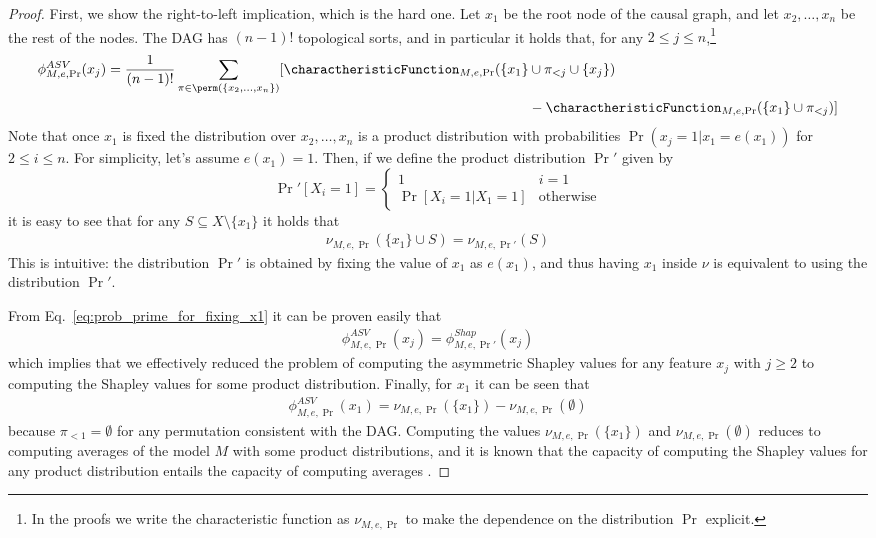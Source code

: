 \documentclass{llncs}
\begin{document}
\begin{proof}
	First, we show the right-to-left implication, which is the hard one. Let $x_1$ be the root node of the causal graph, and let $x_2,\ldots, x_n$ be the rest of the nodes. The DAG has $(n-1)!$ topological sorts, and in particular it holds that, for any $2 \leq j \leq n$,\footnote{In the proofs we write the characteristic function as $\nu_{M,e,\Pr}$ to make the dependence on the distribution $\Pr$ explicit.}
	\begin{align*}
	\phi^{ASV}_{M,e,\Pr}(x_j) = \frac{1}{(n-1)!} \sum_{\pi \in \perm(\{x_2, \ldots, x_n\})} [ \charactheristicFunction_{M,e,\Pr}(\{x_1\} &\cup \pi_{<j} \cup \{x_j\}) \\
	&- \charactheristicFunction_{M,e,\Pr}(\{x_1\} \cup \pi_{<j}) ]
	\end{align*}
	Note that once $x_1$ is fixed the distribution over $x_2,\ldots, x_n$ is a product distribution with probabilities $\Pr\left( x_j = 1 | x_1 = e(x_1) \right)$ for $2 \leq i \leq n$.
	For simplicity, let's assume $e(x_1) = 1$. Then, if we define the product distribution $\Pr'$ given by
	\[
	\Pr\!'[X_i = 1] = 
	\begin{cases}
		1 & i = 1 \\
		\Pr[X_i = 1 | X_1 = 1] & \text{otherwise}
	\end{cases}
	\]
	it is easy to see that for any $S \subseteq X \setminus \{x_1\}$ it holds that
	\begin{align}\label{eq:prob_prime_for_fixing_x1}
		\nu_{M,e,\Pr}(\{x_1\} \cup S) = \nu_{M,e,\Pr'}(S) 
	\end{align}
	This is intuitive: the distribution $\Pr'$ is obtained by fixing the value of $x_1$ as $e(x_1)$, and thus having $x_1$ inside $\nu$ is equivalent to using the distribution $\Pr'$.
	
	From Eq.~\eqref{eq:prob_prime_for_fixing_x1} it can be proven easily that
	\begin{align}
		\phi^{ASV}_{M,e,\Pr} (x_j) = \phi^{Shap}_{M,e,\Pr'}(x_j)
	\end{align}
	which implies that we effectively reduced the problem of computing the asymmetric Shapley values for any feature $x_j$ with $j\geq 2$ to computing the Shapley values for some product distribution. Finally, for $x_1$ it can be seen that
	\begin{align*}
		\phi^{ASV}_{M,e,\Pr}(x_1) = \nu_{M,e,\Pr{}}(\{x_1\}) - \nu_{M,e,\Pr{}}(\emptyset)
	\end{align*}
	because $\pi_{<1} = \emptyset$ for any permutation consistent with the DAG. Computing the values $\nu_{M,e,\Pr{}}(\{x_1\})$ and $\nu_{M,e,\Pr{}}(\emptyset)$ reduces to computing averages of the model $M$ with some product distributions, and it is known that the capacity of computing 
	the Shapley values for any product distribution entails the capacity of computing averages \parencite{van2022tractability}.
	

\end{proof}
\end{document}
